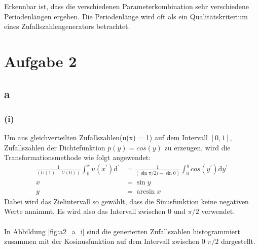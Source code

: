 Erkennbar ist, dass die verschiedenen Parameterkombination sehr verschiedene Periodenlängen ergeben. Die Periodenlänge wird oft als ein Qualitätskriterium eines Zufallszahlengenerators betrachtet.




\section*{Aufgabe 2}

\subsection*{a}
\subsubsection*{(i)}
Um aus gleichverteilten Zufallszahlen(u(x) = 1) auf dem Intervall $[0,1]$, Zufallszahlen
der Dichtefunktion $p(y) = cos(y)$ zu erzeugen, wird die Transformationsmethode
wie folgt angewendet:
\begin{align*}
  \frac{1}{\left(U(1) - U(0)\right)} \int_{0}^{x} u(x^\prime) \mathrm{d}^\prime &= \frac{1}{\left( \sin \pi /2) - \sin 0 \right) }\int_{0}^{y} cos(y^\prime) \mathrm{d}y^\prime\\
  x &= \sin y \\
  y &= \arcsin x
\end{align*}
Dabei wird das Zielintervall so gewählt, dass die Sinusfunktion keine negativen Werte annimmt. Es wird also das Intervall
zwischen $0$ und $\pi / 2$ verwendet.\\ \\
In Abbildung \ref{fig:a2_a_i} sind die generierten Zufallszahlen histogrammiert zusammen mit der Kosinusfunktion auf dem Intervall zwischen $0$ $\pi / 2$ dargestellt.

